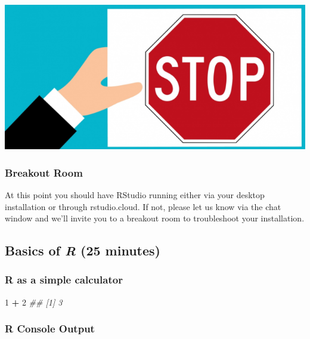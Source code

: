 \documentclass[]{book}
\newenvironment{Shaded}{\begin{snugshade}}{\end{snugshade}}
\newcommand{\CommentTok}[1]{\textcolor[rgb]{0.56,0.35,0.01}{\textit{#1}}}
\newcommand{\DecValTok}[1]{\textcolor[rgb]{0.00,0.00,0.81}{#1}}
\newcommand{\OperatorTok}[1]{\textcolor[rgb]{0.81,0.36,0.00}{\textbf{#1}}}
\newcommand{\StringTok}[1]{\textcolor[rgb]{0.31,0.60,0.02}{#1}}
\begin{document}
\includegraphics[width=9.28in]{images/breakout_stop}

\hypertarget{breakout-room}{%
\subsubsection*{Breakout Room}\label{breakout-room}}

At this point you should have RStudio running either via your desktop installation or through rstudio.cloud. If not, please let us know via the chat window and we'll invite you to a breakout room to troubleshoot your installation.

\hypertarget{basics-of-r-25-minutes}{%
\subsection{\texorpdfstring{Basics of \emph{R} (25 minutes)}{Basics of R (25 minutes)}}\label{basics-of-r-25-minutes}}

\hypertarget{r-as-a-simple-calculator}{%
\subsubsection*{R as a simple calculator}\label{r-as-a-simple-calculator}}

\begin{Shaded}
\begin{Highlighting}[]
\DecValTok{1} \OperatorTok{+}\StringTok{ }\DecValTok{2}
\CommentTok{## [1] 3}
\end{Highlighting}
\end{Shaded}

\hypertarget{r-console-output}{%
\subsubsection*{R Console Output}\label{r-console-output}}
\end{document}
